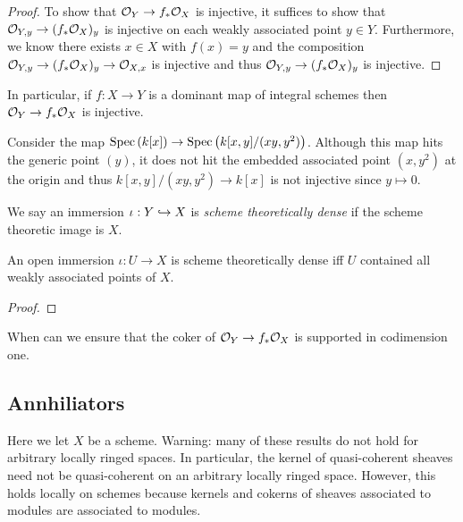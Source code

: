 \documentclass[12pt]{article}
\begin{document}
\begin{proof}
To show that $\mathcal{O}_{Y} \to f_* \mathcal{O}_{X}$ is injective, it suffices to show that $\mathcal{O}_{Y, y} \to (f_* \mathcal{O}_{X})_y$ is injective on each weakly associated point $y \in Y$. Furthermore, we know there exists $x \in X$ with $f(x) = y$ and the composition $\mathcal{O}_{Y, y} \to (f_* \mathcal{O}_{X})_y \to \mathcal{O}_{X, x}$ is injective and thus $\mathcal{O}_{Y, y} \to (f_* \mathcal{O}_{X})_y$ is injective.
\end{proof}

\begin{rmk}
In particular, if $f : X \to Y$ is a dominant map of integral schemes then $\mathcal{O}_{Y} \to f_* \mathcal{O}_{X}$ is injective.
\end{rmk}

\begin{example}
Consider the map $\mathrm{Spec}\left( k[x] \right) \to \mathrm{Spec}\left( k[x,y]/(xy, y^2) \right)$. Although this map hits the generic point $(y)$, it does not hit the embedded associated point $(x, y^2)$ at the origin and thus $k[x,y]/(xy, y^2) \to k[x]$ is not injective since $y \mapsto 0$.
\end{example}

\begin{defn}
We say an immersion $\iota : Y \hookrightarrow X$ is \textit{scheme theoretically dense} if the scheme theoretic image is $X$. 
\end{defn}

\begin{lemma}
An open immersion $\iota : U \to X$ is scheme theoretically dense iff $U$ contained all weakly associated points of $X$.
\end{lemma}

\begin{proof}

\end{proof}

When can we ensure that the coker of $\mathcal{O}_{Y} \to f_* \mathcal{O}_{X}$ is supported in codimension one.

\subsection{Annhiliators}

\begin{rmk}
Here we let $X$ be a scheme. Warning: many of these results do not hold for arbitrary locally ringed spaces. In particular, the kernel of quasi-coherent sheaves need not be quasi-coherent on an arbitrary locally ringed space. However, this holds locally on schemes because kernels and cokerns of sheaves associated to modules are associated to modules.
\end{rmk}
\end{document}
